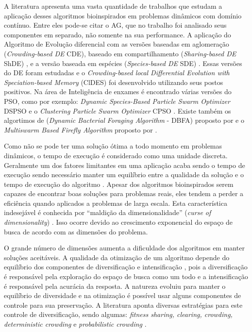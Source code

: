 A literatura apresenta uma vasta quantidade de trabalhos que estudam a aplicação desses algoritmos bioinspirados em problemas dinâmicos com domínio contínuo. Entre eles pode-se citar o AG, que no trabalho \cite{rand2005measurements} foi analisado seus componentes em separado, não somente na sua performance. A aplicação do Algoritmo de Evolução diferencial com as versões baseadas em aglomeração (\textit{Crowding-based DE} CDE), baseado em compartilhamento (\textit{Sharing-based DE} ShDE) \cite{thomsen2004multimodal}, e a versão baseada em espécies (\textit{Species-based DE} SDE) \cite{li2005efficient}. Essas versões do DE foram estudadas e o \textit{Crowding-based local Differential Evolution with Speciation-based Memory} (ClDES) foi desenvolvido utilizando seus postos positivos. Na área de Inteligência de enxames é encontrado várias versões do PSO, como por exemplo: \textit{Dynamic Species-Based Particle Swarm Optimizer} DSPSO \cite{parrott2006locating} e o \textit{Clustering Particle Swarm Optimizer} CPSO \cite{yang2010clustering}. Existe também os algortimos de (\textit{Dynamic Bacterial Foraging Algorithm} - DBFA) proposto por \cite{passino2002biomimicry} e o \textit{Multiswarm Based Firefly Algorithm} proposto por \cite{farahani2011multiswarm}.

Como não se pode ter uma solução ótima a todo momento em problemas dinâmicos, o tempo de execução é considerado como uma unidade discreta. Geralmente um dos fatores limitantes em uma aplicação acaba sendo o tempo de execução sendo necessário manter um equilíbrio entre a qualidade da solução e o tempo de execução do algoritmo \cite{li2006new}. Apesar dos algoritmos bioinspirados serem capazes de encontrar boas soluções para problemas reais, eles tendem a perder a eficiência quando aplicados a problemas de larga escala. Esta característica indesejável é conhecida por “maldição da dimensionalidade” (\textit{curse of dimensionality}) \cite{bellman2015applied}. Isso ocorre devido ao crescimento exponencial do espaço de busca de acordo com as dimensões do problema.

O grande número de dimensões aumenta a dificuldade dos algoritmos em manter soluções aceitáveis. A qualidade da otimização de um algoritmo depende do equilíbrio dos componentes de diversificação e intensificação \cite{boussaid2013survey}, pois a diversificação é responsável pela exploração do espaço de busca como um todo e a intensificação é responsável pela acurácia da resposta. A natureza evoluiu para manter o equilíbrio de diversidade e na otimização é possível usar alguns componentes de controle para sua preservação. A literatura aponta diversas estratégias para este controle de diversificação, sendo algumas: \textit{fitness sharing, clearing, crowding, deterministic crowding} e \textit{probabilistic crowding} \cite{andre2015multiple}.

